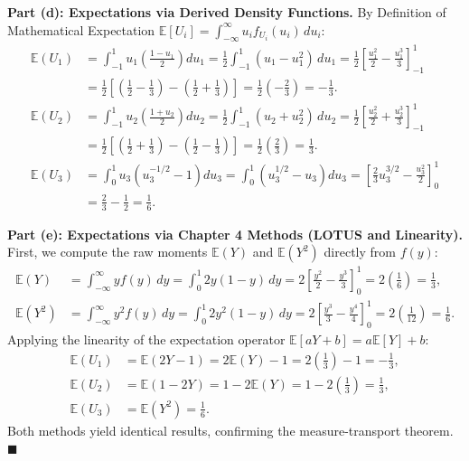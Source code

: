 \documentclass[11pt, letterpaper]{article}
\theoremstyle{definition}
\theoremstyle{remark}
\newcommand{\E}{\mathbb{E}}
\begin{document}
\textbf{Part (d): Expectations via Derived Density Functions.}
By Definition of Mathematical Expectation $\E[U_i] = \int_{-\infty}^{\infty} u_i f_{U_i}(u_i)\,du_i$:
\begin{align*}
    \E(U_1) &= \int_{-1}^{1} u_1 \left(\frac{1 - u_1}{2}\right) du_1 = \frac{1}{2} \int_{-1}^{1} (u_1 - u_1^2)\,du_1 = \frac{1}{2} \left[ \frac{u_1^2}{2} - \frac{u_1^3}{3} \right]_{-1}^{1} \\
    &= \frac{1}{2} \left[ \left(\frac{1}{2} - \frac{1}{3}\right) - \left(\frac{1}{2} + \frac{1}{3}\right) \right] = \frac{1}{2}\left(-\frac{2}{3}\right) = -\frac{1}{3}. \\[6pt]
    \E(U_2) &= \int_{-1}^{1} u_2 \left(\frac{1 + u_2}{2}\right) du_2 = \frac{1}{2} \int_{-1}^{1} (u_2 + u_2^2)\,du_2 = \frac{1}{2} \left[ \frac{u_2^2}{2} + \frac{u_2^3}{3} \right]_{-1}^{1} \\
    &= \frac{1}{2} \left[ \left(\frac{1}{2} + \frac{1}{3}\right) - \left(\frac{1}{2} - \frac{1}{3}\right) \right] = \frac{1}{2}\left(\frac{2}{3}\right) = \frac{1}{3}. \\[6pt]
    \E(U_3) &= \int_{0}^{1} u_3 \left(u_3^{-1/2} - 1\right) du_3 = \int_{0}^{1} \left(u_3^{1/2} - u_3\right) du_3 = \left[ \frac{2}{3}u_3^{3/2} - \frac{u_3^2}{2} \right]_{0}^{1} \\
    &= \frac{2}{3} - \frac{1}{2} = \frac{1}{6}.
\end{align*}

\textbf{Part (e): Expectations via Chapter 4 Methods (LOTUS and Linearity).}
First, we compute the raw moments $\E(Y)$ and $\E(Y^2)$ directly from $f(y)$:
\begin{align*}
    \E(Y) &= \int_{-\infty}^{\infty} y f(y)\,dy = \int_{0}^{1} 2y(1 - y)\,dy = 2\left[ \frac{y^2}{2} - \frac{y^3}{3} \right]_{0}^{1} = 2\left(\frac{1}{6}\right) = \frac{1}{3}, \\
    \E(Y^2) &= \int_{-\infty}^{\infty} y^2 f(y)\,dy = \int_{0}^{1} 2y^2(1 - y)\,dy = 2\left[ \frac{y^3}{3} - \frac{y^4}{4} \right]_{0}^{1} = 2\left(\frac{1}{12}\right) = \frac{1}{6}.
\end{align*}
Applying the linearity of the expectation operator $\E[aY + b] = a\E[Y] + b$:
\begin{align*}
    \E(U_1) &= \E(2Y - 1) = 2\E(Y) - 1 = 2\left(\frac{1}{3}\right) - 1 = -\frac{1}{3}, \\
    \E(U_2) &= \E(1 - 2Y) = 1 - 2\E(Y) = 1 - 2\left(\frac{1}{3}\right) = \frac{1}{3}, \\
    \E(U_3) &= \E(Y^2) = \frac{1}{6}.
\end{align*}
Both methods yield identical results, confirming the measure-transport theorem. \hfill $\blacksquare$
\end{document}
